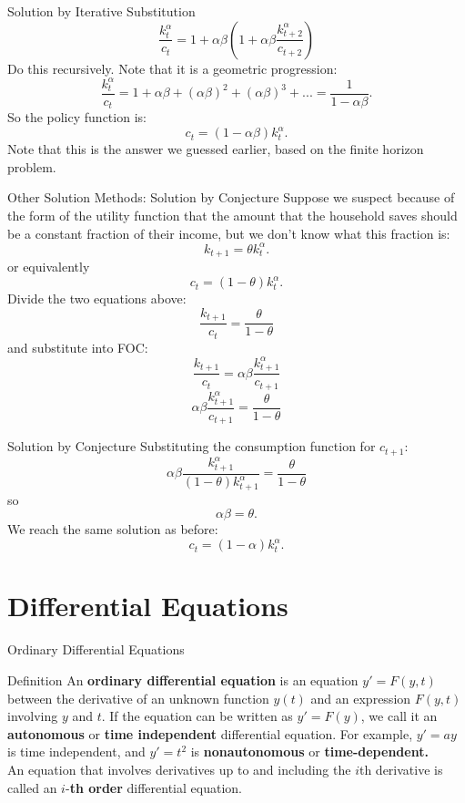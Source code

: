 \documentclass{beamer}
\begin{document}
\begin{frame}{Solution by Iterative Substitution}
 \[\frac{k_{t}^\alpha}{c_t}=1+\alpha \beta (1+\alpha \beta \frac{k_{t+2}^\alpha}{c_{t+2}})
    \]
Do this recursively. Note that it is a geometric progression:
 \[\frac{k_{t}^\alpha}{c_t}=1+\alpha \beta +(\alpha \beta)^2+(\alpha \beta)^3+... =\frac{1}{1-\alpha \beta }.
    \]
    So the policy function is:
    \[c_t=(1-\alpha \beta )k_t^\alpha.
    \]
    Note that this is the answer we guessed earlier, based on the finite horizon problem. 
\end{frame}
\begin{frame}{Other Solution Methods: Solution by Conjecture}
   Suppose we suspect because of the form of the utility function that the amount that the household saves should be a constant fraction of their income, but we don't know what this fraction is:
   \[k_{t+1}=\theta k_t^\alpha.
   \]
   or equivalently
   \[c_t=(1-\theta)k_t^\alpha.
   \]
   Divide the two equations above:
   \[\frac{k_{t+1}}{c_t}=\frac{\theta}{1-\theta}
   \]
   and substitute into FOC:
   \[\frac{k_{t+1}}{c_t}=\alpha \beta \frac{k_{t+1}^\alpha}{c_{t+1}}
   \]
   \[\alpha \beta \frac{k_{t+1}^\alpha}{c_{t+1}}=\frac{\theta}{1-\theta}
   \]\end{frame}
\begin{frame}{Solution by Conjecture}
   Substituting the consumption function for $c_{t+1}$:
    \[\alpha \beta \frac{k_{t+1}^\alpha}{(1-\theta)k_{t+1}^\alpha}=\frac{\theta}{1-\theta}
   \]
   so 
   \[\alpha \beta =\theta.
   \]
   We reach the same solution as before:
   \[c_t=(1-\alpha)k_t^\alpha.
   \]
\end{frame}
\section{ Differential Equations}
\begin{frame}{Ordinary Differential Equations}
      \begin{block}{Definition}
    An \textbf{ordinary differential equation} is an equation $y'=F(y,t)$ between the derivative of an unknown function $y(t)$ and an expression $F(y,t) $ involving $y$ and $t$. 
    If the equation can be written as $y'=F(y)$, we call it an \textbf{autonomous} or \textbf{time independent} differential equation. For example, $y'=ay$ is time independent, and $y'=t^2$ is \textbf{nonautonomous} or \textbf{time-dependent.} \\
    
    An equation that involves derivatives up to and including the $i$th derivative is called an $i$-\textbf{th order} differential equation. 
    \end{block}
\end{frame}
\end{document}
